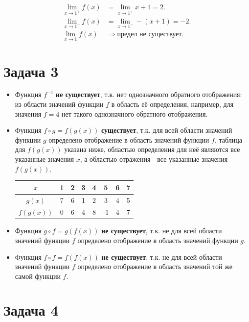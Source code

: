 \documentclass[a4paper,11pt]{article}
\begin{document}
\begin{equation*}
\begin{split}
\lim_{x \rightarrow 1^+} f(x) & = \lim_{x \rightarrow 1^+} x+1 = 2. \\
\lim_{x \rightarrow 1^-} f(x) & = \lim_{x \rightarrow 1^-} -(x+1) = -2. \\
\lim_{x \rightarrow 1}   f(x) & \Rightarrow \text{предел не существует}.
\end{split}
\end{equation*}

\section{Задача 3}

\begin{itemize}
\item Функция $f^{-1}$ \textbf{не существует}, т.к. нет однозначного обратного отображения: из области значений функции $f$  в область её определения, например, для значения $f=4$ нет такого однозначного обратного отображения.
\item Функция $f \circ g = f(g(x))$ \textbf{существует}, т.к. для всей области значений функции $g$ определено отображение в область значений функции $f$, таблица для $f(g(x))$ указана ниже, областью определения для неё являются все указанные значения $x$, а областью отражения - все указанные значения $f(g(x))$.

\begin{tabular}{|c|c|c|c|c|c|c|c|}
\hline 
 $x$       & 1 & 2 & 3 & 4 & 5 & 6 & 7 \\ 
\hline 
 $g(x)$    & 7 & 6 & 1 & 2 & 3 & 4 & 5 \\ 
\hline 
 $f(g(x))$ & 0 & 6 & 4 & 8 & -1 & 4 & 7 \\
\hline 
\end{tabular} 

\item Функция $g \circ f = g(f(x))$ \textbf{не существует}, т.к. не для всей области значений функции $f$ определено отображение в область значений функции $g$.
\item Функция $f \circ f = f(f(x))$ \textbf{не существует}, т.к. не для всей области значений функции $f$ определено отображение в область значений той же самой функции $f$.
\end{itemize}

\section{Задача 4}
\end{document}
